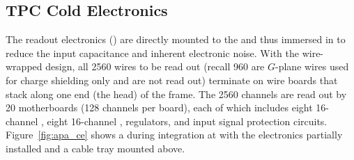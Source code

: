 \subsection{TPC Cold Electronics}
\label{sec:fdsp-apa-intfc-elec}

The  readout electronics () are directly mounted to the  and thus immersed in  to reduce the input capacitance and inherent electronic noise.  With the wire-wrapped design, all \num{2560} wires to be read out (recall \num{960} are $G$-plane wires used for charge shielding only and are not read out) terminate on wire boards that stack along one end (the head) of the  frame.  The \num{2560} channels are read out by \num{20}  motherboards (\num{128} channels per board), each of which includes eight \num{16}-channel  , eight \num{16}-channel  ,  regulators, and input signal protection circuits.  Figure~\ref{fig:apa_ce} shows a   during integration at  with the  electronics partially installed and a cable tray mounted above. 

